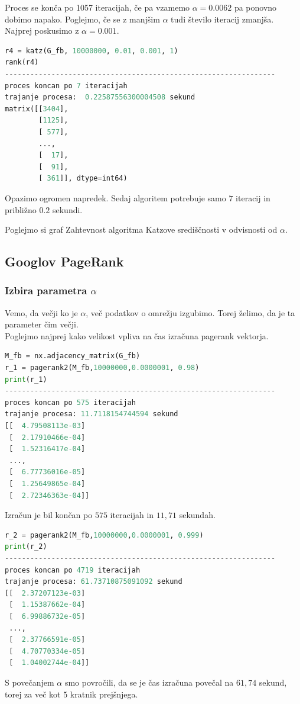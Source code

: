 \documentclass[a4paper]{article}
\begin{document}
Proces se konča po 1057 iteracijah, če pa vzamemo $\alpha = 0.0062$ pa ponovno dobimo napako. Poglejmo, če se z manjšim $\alpha$ tudi število iteracij zmanjša. Najprej poskusimo z $\alpha = 0.001.$

\begin{lstlisting}[language=Python]
r4 = katz(G_fb, 10000000, 0.01, 0.001, 1)
rank(r4)
----------------------------------------------------------------
proces koncan po 7 iteracijah
trajanje procesa:  0.22587556300004508 sekund
matrix([[3404],
        [1125],
        [ 577],
        ...,
        [  17],
        [  91],
        [ 361]], dtype=int64)
\end{lstlisting}

Opazimo ogromen napredek. Sedaj algoritem potrebuje samo $7$ iteracij in približno $0.2$ sekundi.

Poglejmo si graf Zahtevnost algoritma Katzove središčnosti v odvisnosti od $\alpha.$


\subsection{Googlov PageRank}
\subsubsection{Izbira parametra $\alpha$} 
\hspace{4.8mm}Vemo, da večji ko je $\alpha$, več podatkov o omrežju izgubimo. Torej želimo, da je ta parameter čim večji. \\
Poglejmo najprej kako velikost vpliva na čas izračuna pagerank vektorja. 

\begin{lstlisting}[language=Python]
M_fb = nx.adjacency_matrix(G_fb)
r_1 = pagerank2(M_fb,10000000,0.0000001, 0.98)
print(r_1)
----------------------------------------------------------------
proces koncan po 575 iteracijah
trajanje procesa: 11.7118154744594 sekund
[[  4.79508113e-03]
 [  2.17910466e-04]
 [  1.52316417e-04]
 ..., 
 [  6.77736016e-05]
 [  1.25649865e-04]
 [  2.72346363e-04]]
\end{lstlisting}

Izračun je bil končan po $575$ iteracijah in $11,71$ sekundah.

\begin{lstlisting}[language=Python]
r_2 = pagerank2(M_fb,10000000,0.0000001, 0.999)
print(r_2)
----------------------------------------------------------------
proces koncan po 4719 iteracijah
trajanje procesa: 61.73710875091092 sekund
[[  2.37207123e-03]
 [  1.15387662e-04]
 [  6.99886732e-05]
 ..., 
 [  2.37766591e-05]
 [  4.70770334e-05]
 [  1.04002744e-04]]
\end{lstlisting}
S povečanjem $\alpha$ smo povročili, da se je čas izračuna povečal na $61,74$ sekund, torej za več kot $5$ kratnik prejšnjega. 
\end{document}
